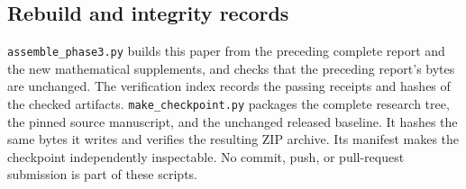 \subsection{Rebuild and integrity records}

\nolinkurl{assemble_phase3.py} builds this paper from the preceding
complete report and the new mathematical supplements, and checks that
the preceding report's bytes are unchanged. The verification index
records the passing receipts and hashes of the checked artifacts.
\nolinkurl{make_checkpoint.py} packages the complete research tree,
the pinned source manuscript, and the unchanged released baseline.
It hashes the same bytes it writes and verifies the resulting ZIP
archive. Its manifest makes the checkpoint independently inspectable.
No commit, push, or pull-request submission is part of these scripts.
